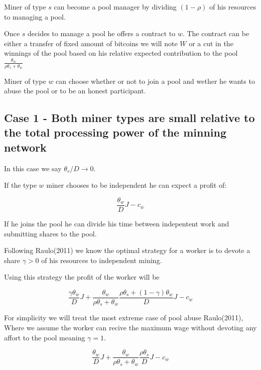 \documentclass{article}
\begin{document}
Miner of type $s$ can become a pool manager by dividing $(1-\rho)$ of his resources to managing a pool.

Once $s$ decides to manage a pool he offers a contract to $w$. The contract can be either a transfer of fixed amount of bitcoins  we will note $W$ or a cut in the winnings of the pool based on his relative expected contribution to the pool $\frac{\theta_{w}}{\rho \theta_{s}+\theta_{w}}$

Miner of type $w$ can choose whether or not to join a pool and wether he wants to abuse the pool or to be an honest participant.

\subsection{Case 1 - Both miner types are small relative to the total processing power of the minning network}

In this case we say $\theta_{s}/D\rightarrow 0$.


If the type $w$ miner chooses to be independent he can expect a profit of:

\begin{equation}\label{EQ:Profit_Weak_ind}
\frac{\theta_{w}}{D}J-c_{w}
\end{equation}

If he joins the pool he can divide his time between indepentent work and submitting shares to the pool.

Following Raulo(2011) we know the optimal strategy for a worker is to devote a share $\gamma>0$ of his resources to independent mining.

Using this strategy the profit of the worker will be

\begin{equation}\label{EQ:Profit_Weak_pool}
\frac{\gamma\theta_{w}}{D}J+ \frac{ \theta_{w}}{\rho \theta_{s}+ \theta_{w}} \frac{\rho \theta_{s}+(1-\gamma) \theta_{w}}{D} J -c_{w} 
\end{equation}


For simplicity we will treat the most extreme case of pool abuse Raulo(2011), Where we assume the worker can recive the maximum wage without devoting any affort to the pool meaning $\gamma=1$.


\begin{equation}\label{EQ:Profit_Weak_pool_abuse}
\frac{\theta_{w}}{D}J+ \frac{ \theta_{w}}{\rho \theta_{s}+ \theta_{w}} \frac{\rho \theta_{s}}{D} J -c_{w} 
\end{equation}
\end{document}
